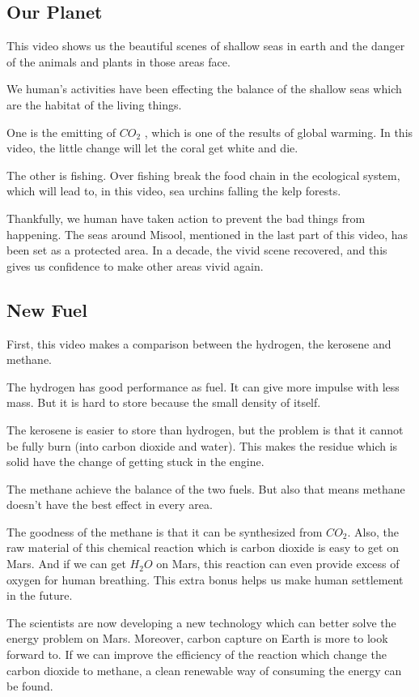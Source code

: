 \documentclass{article}
\begin{document}
\subsection{Our Planet}
This video shows us the beautiful scenes of shallow seas in earth and the danger of the animals and plants in those areas face.

We human's activities have been effecting the balance of the shallow seas which are the habitat of the living things.

One is the emitting of $CO_2$ , which is one of the results of global warming. In this video, the little change will let the coral get white and die.

The other is fishing. Over fishing break the food chain in the ecological system, which will lead to, in this video, sea urchins falling the kelp forests.

Thankfully, we human have taken action to prevent the bad things from happening. The seas around Misool, mentioned in the last part of this video, has been set as a protected area. In a decade, the vivid scene recovered, and this gives us confidence to make other areas vivid again.

\subsection{New Fuel}
First, this video makes a comparison between the hydrogen, the kerosene and methane.

The hydrogen has good performance as fuel. It can give more impulse with less mass. But it is hard to store because the small density of itself.

The kerosene is easier to store than hydrogen, but the problem is that it cannot be fully burn (into carbon dioxide and water). This makes the residue which is solid have the change of getting stuck in the engine.

The methane achieve the balance of the two fuels. But also that means methane doesn't have the best effect in every area.

The goodness of the methane is that it can be synthesized from $CO_2$. Also, the raw material of this chemical reaction which is carbon dioxide is easy to get on Mars. And if we can get $H_2O$ on Mars, this reaction can even provide excess of oxygen for human breathing. This extra bonus helps us make human settlement in the future.

The scientists are now developing a new technology which can better solve the energy problem on Mars. Moreover, carbon capture on Earth is more to look forward to. If we can improve the efficiency of the reaction which change the carbon dioxide to methane, a clean renewable way of consuming the energy can be found.
\end{document}
